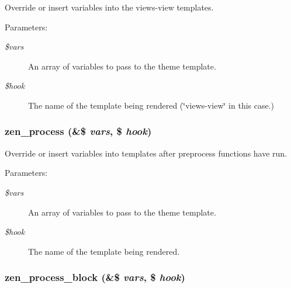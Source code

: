 Override or insert variables into the views-view templates.

\begin{Desc}
\item[Parameters:]
\begin{description}
\item[{\em \$vars}]An array of variables to pass to the theme template. \item[{\em \$hook}]The name of the template being rendered (\char`\"{}views-view\char`\"{} in this case.) \end{description}
\end{Desc}
\hypertarget{sites_2all_2themes_2zen_2template_8php_3790b825810aa4bfd00c27c37817a7d8}{
\subsubsection[{zen\_\-process}]{\setlength{\rightskip}{0pt plus 5cm}zen\_\-process (\&\$ {\em vars}, \/  \$ {\em hook})}}
\label{sites_2all_2themes_2zen_2template_8php_3790b825810aa4bfd00c27c37817a7d8}


Override or insert variables into templates after preprocess functions have run.

\begin{Desc}
\item[Parameters:]
\begin{description}
\item[{\em \$vars}]An array of variables to pass to the theme template. \item[{\em \$hook}]The name of the template being rendered. \end{description}
\end{Desc}
\hypertarget{sites_2all_2themes_2zen_2template_8php_0c023dd21d8efaa99574aa6821bfcc32}{
\subsubsection[{zen\_\-process\_\-block}]{\setlength{\rightskip}{0pt plus 5cm}zen\_\-process\_\-block (\&\$ {\em vars}, \/  \$ {\em hook})}}
\label{sites_2all_2themes_2zen_2template_8php_0c023dd21d8efaa99574aa6821bfcc32}


